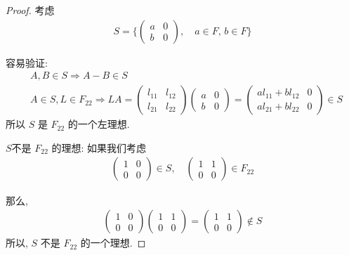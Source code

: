 \documentclass[utf8]{ctexbook}
\theoremstyle{definition}
\begin{document}
\begin{proof}
考虑 
\begin{align*}
S = \{ \left( 
\begin{array}{cc}
a & 0 \\
b & 0
\end{array}
\right), \quad a \in F, \, b \in F \}
\end{align*}

容易验证:
\begin{align*}
& A, B \in S \Longrightarrow A- B \in S \\
& A \in S, L \in F_{22} \Longrightarrow L A = \left( \begin{array}{cc}
l_{11} & l_{12} \\
l_{21} & l_{22}
\end{array} 
\right)
\left( 
\begin{array}{cc}
a & 0 \\
b & 0
\end{array}
\right)
=
\left( 
\begin{array}{cc}
a l_{11} + b l_{12} & 0 \\
a l_{21} + b l_{22} & 0
\end{array}
\right)
\in S
\end{align*}
所以 $S$ 是 $F_{22}$ 的一个左理想.

$S$不是 $F_{22}$ 的理想: 如果我们考虑
\begin{align*}
\left( 
\begin{array}{cc}
1 & 0 \\
0 & 0
\end{array}
\right) \in S, \quad 
\left( 
\begin{array}{cc}
1 & 1 \\
0 & 0
\end{array}
\right) \in F_{22}
\end{align*}

那么,
\begin{align*}
\left( 
\begin{array}{cc}
1 & 0 \\
0 & 0
\end{array}
\right) 
\left( 
\begin{array}{cc}
1 & 1 \\
0 & 0
\end{array}
\right) 
= 
\left( 
\begin{array}{cc}
1 & 1 \\
0 & 0
\end{array}
\right) 
\not \in S
\end{align*}
所以, $S$ 不是 $F_{22}$ 的一个理想.

\end{proof}
\end{document}
